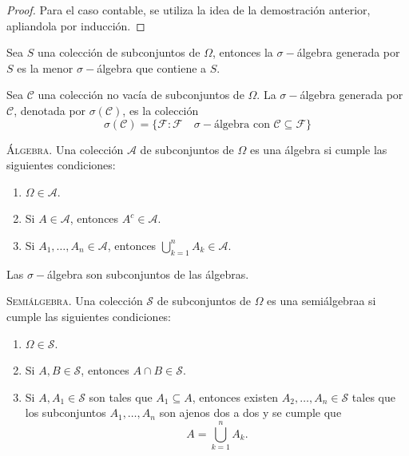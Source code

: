 \begin{proof}
	Para el caso contable, se utiliza la idea de la demostración anterior, apliandola por inducción.
\end{proof}


\begin{definicion}
	Sea $S$ una colección de subconjuntos de $\Omega$, entonces la $\sigma -$álgebra generada por $S$ es la menor $\sigma -$álgebra que contiene a $S$.
\end{definicion}



\begin{definicion}
	Sea $\mathscr{C}$ una colección no vacía de subconjuntos de $\Omega$. La $\sigma -$álgebra generada por $\mathscr{C}$, denotada por $\sigma (\mathscr{C})$, es la colección 
		$$\sigma (\mathscr{C}) = \{ \mathscr{F}:\mathscr{F} \quad \sigma -\text{álgebra con } \mathscr{C}\subseteq \mathscr{F} \}$$
\end{definicion}



\begin{definicion}
	{\scshape{Álgebra.}} Una colección $\mathscr{A}$ de subconjuntos de $\Omega$ es una álgebra si cumple las siguientes condiciones:
	\begin{enumerate}
		\item $\Omega \in \mathscr{A}$.
		\item Si $A \in \mathscr{A}$, entonces $A^c \in \mathscr{A}$.
		\item Si $A_1 ,\ldots , A_n \in \mathscr{A}$, entonces $\displaystyle\bigcup _{k=1} ^n A_k \in \mathscr{A}$.
	\end{enumerate}
\end{definicion}
Las $\sigma -$álgebra son subconjuntos de las álgebras.

\begin{definicion}
	{\scshape{Semiálgebra.}} Una colección $\mathscr{S}$ de subconjuntos de $\Omega$ es una semiálgebraa si cumple las siguientes condiciones:
	\begin{enumerate}
		\item $\Omega \in \mathscr{S}$.
		\item Si $A,B\in \mathscr{S}$, entonces $A\cap B \in \mathscr{S}$.
		\item Si $A,A_1 \in \mathscr{S}$ son tales que $A_1 \subseteq A$, entonces existen $A_2 ,\ldots ,A_n \in \mathscr{S}$ tales que los subconjuntos $A_1 ,\ldots ,A_n$ son ajenos dos a dos y se cumple que
			$$A = \bigcup _{k=1} ^n A_k .$$
	\end{enumerate}
\end{definicion}


